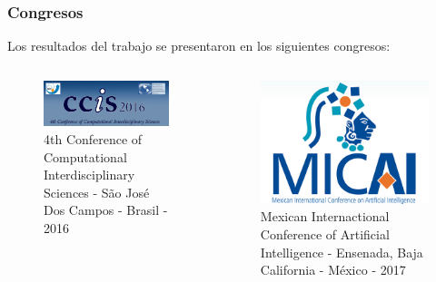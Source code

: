 \documentclass[usenames,dvipsnames]{beamer}
\begin{document}
\begin{frame}
\frametitle{Congresos}  
\begin{exampleblock}{}
 Los resultados del trabajo se presentaron en los siguientes congresos:
\end{exampleblock}
\begin{columns}[onlytextwidth]
\begin{column}{.45\textwidth}
\begin{figure}
  \includegraphics[width=\textwidth]{graphics/Flyer-CCIS-2016v6.png}
  \caption{4th Conference of Computational Interdisciplinary Sciences - São José Dos Campos - Brasil - 2016}
\end{figure}
\end{column}
\hfill
\begin{column}{.45\textwidth}
		\begin{figure}
		  \includegraphics[width=\textwidth]{graphics/LOGO-MICAI-2015-OK.jpg}
		  \caption{Mexican Internactional Conference of Artificial Intelligence - Ensenada, Baja California - México - 2017}
		\end{figure}
\end{column}
\end{columns}
\end{frame}
\end{document}

